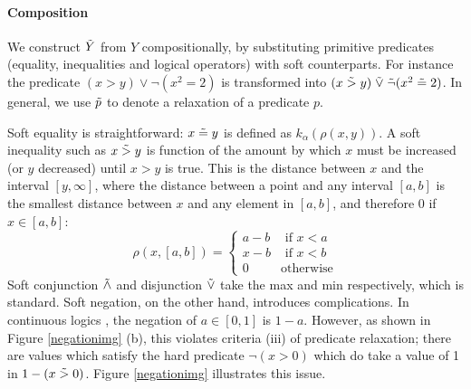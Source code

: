 \paragraph{Composition} We construct $\tilde{Y}$ from $Y$ compositionally, by substituting primitive predicates (equality, inequalities and logical operators) with soft counterparts.
For instance the predicate $(x > y) \lor \neg(x^2 = 2)$ is transformed into $(x \mathrel{\tilde{>}} y) \mathrel{\tilde{\lor}} \tilde{\neg}(x^2 \mathrel{\tilde{=}} 2)$.
In general, we use $\mathrel{\tilde{p}}$ to denote a relaxation of a predicate $p$.

Soft equality is straightforward: $x \mathrel{\tilde{=}} y$ is defined as $k_\alpha(\rho(x, y))$.
A soft inequality such as $x \mathrel{\tilde{>}} y$ is function of the amount by which $x$ must be increased (or $y$ decreased) until $x > y$ is true.
This is the distance between $x$ and the interval $[y, \infty]$, where the distance between a point and any interval $[a, b]$ is the smallest distance between $x$ and any element in $[a, b]$, and therefore 0 if $x \in [a, b]$:
\begin{equation}
\rho(x, [a, b]) =
\begin{cases}
  a - b & \text{ if } x < a\\
  x - b & \text{ if } x < b\\
  0              & \text{otherwise}
\end{cases}
\end{equation}
Soft conjunction $\mathrel{\tilde{\land}}$ and disjunction $\mathrel{\tilde{\lor}}$ take the max and min respectively, which is standard.
Soft negation, on the other hand, introduces complications.
In continuous logics \cite{kimmig2012short}, the negation of $a \in [0, 1]$ is $1 - a$.
However, as shown in Figure \ref{negationimg} (b), this violates criteria (iii) of predicate relaxation; there are values which satisfy the hard predicate $\neg(x > 0)$ which do take a value of 1 in $1 - (x \mathrel{\tilde{>}} 0)$.
Figure \ref{negationimg} illustrates this issue.



